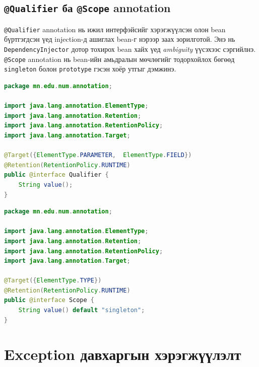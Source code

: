 \subsection{\texttt{@Qualifier} ба \texttt{@Scope} annotation}

\texttt{@Qualifier} annotation нь ижил интерфэйсийг хэрэгжүүлсэн олон
bean бүртгэгдсэн үед injection-д ашиглах bean-г нэрээр заах зорилготой.
Энэ нь \texttt{DependencyInjector} дотор тохирох bean хайх үед
\textit{ambiguity} үүсэхээс сэргийлнэ. \texttt{@Scope} annotation нь
bean-ийн амьдралын мөчлөгийг тодорхойлох бөгөөд \texttt{singleton}
болон \texttt{prototype} гэсэн хоёр утгыг дэмжинэ.

\begin{lstlisting}[language=Java,
    caption={\texttt{@Qualifier} annotation-ийн хэрэгжүүлэлт},
    label={lst:qualifier-annotation}]
package mn.edu.num.annotation;

import java.lang.annotation.ElementType;
import java.lang.annotation.Retention;
import java.lang.annotation.RetentionPolicy;
import java.lang.annotation.Target;

@Target({ElementType.PARAMETER,  ElementType.FIELD})
@Retention(RetentionPolicy.RUNTIME)
public @interface Qualifier {
    String value();
}

\end{lstlisting}

\begin{lstlisting}[language=Java,
    caption={\texttt{@Scope} annotation-ийн хэрэгжүүлэлт},
    label={lst:scope-annotation}]
package mn.edu.num.annotation;

import java.lang.annotation.ElementType;
import java.lang.annotation.Retention;
import java.lang.annotation.RetentionPolicy;
import java.lang.annotation.Target;

@Target({ElementType.TYPE})
@Retention(RetentionPolicy.RUNTIME)
public @interface Scope {
    String value() default "singleton";
}


\end{lstlisting}
\section{Exception давхаргын хэрэгжүүлэлт}

